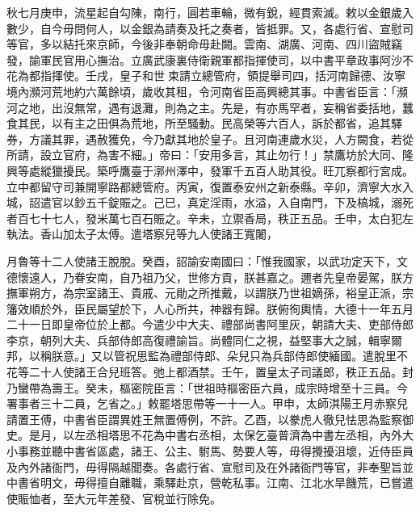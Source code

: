 \begin{pinyinscope}
 秋七月庚申，流星起自勾陳，南行，圓若車輪，微有銳，經貫索滅。敕以金銀歲入數少，自今毋問何人，以金銀為請奏及托之奏者，皆抵罪。又，各處行省、宣慰司等官，多以結托來京師，今後非奉朝命毋赴闕。雲南、湖廣、河南、四川盜賊竊發，諭軍民官用心撫治。立廣武康裏侍衛親軍都指揮使司，以中書平章政事阿沙不花為都指揮使。壬戌，皇子和世束請立總管府，領提舉司四，括河南歸德、汝寧境內瀕河荒地約六萬餘頃，歲收其租，令河南省臣高興總其事。中書省臣言：「瀕河之地，出沒無常，遇有退灘，則為之主。先是，有亦馬罕者，妄稱省委括地，蠶食其民，以有主之田俱為荒地，所至騷動。民高榮等六百人，訴於都省，追其驛券，方議其罪，遇赦獲免，今乃獻其地於皇子。且河南連歲水災，人方闕食，若從所請，設立官府，為害不細。」帝曰：「安用多言，其止勿行！」禁鷹坊於大同、隆興等處縱獵擾民。築呼鷹臺于漷州澤中，發軍千五百人助其役。旺兀察都行宮成。立中都留守司兼開寧路都總管府。丙寅，復置泰安州之新泰縣。辛卯，濟寧大水入城，詔遣官以鈔五千錠賑之。己巳，真定淫雨，水溢，入自南門，下及槁城，溺死者百七十七人，發米萬七百石賑之。辛未，立禦香局，秩正五品。壬申，太白犯左執法。香山加太子太傅。遣塔察兒等九人使諸王寬闍，



 月魯等十二人使諸王脫脫。癸酉，詔諭安南國曰：「惟我國家，以武功定天下，文德懷遠人，乃眷安南，自乃祖乃父，世修方貢，朕甚嘉之。邇者先皇帝晏駕，朕方撫軍朔方，為宗室諸王、貴戚、元勛之所推戴，以謂朕乃世祖嫡孫，裕皇正派，宗籓效順於外，臣民屬望於下，人心所共，神器有歸。朕俯徇輿情，大德十一年五月二十一日即皇帝位於上都。今遣少中大夫、禮部尚書阿里灰，朝請大夫、吏部侍郎李京，朝列大夫、兵部侍郎高復禮諭旨。尚體同仁之視，益堅事大之誠，輯寧爾邦，以稱朕意。」又以管祝思監為禮部侍郎、朵兒只為兵部侍郎使緬國。遣脫里不花等二十人使諸王合兒班答。弛上都酒禁。壬午，置皇太子司議郎，秩正五品。封乃蠻帶為壽王。癸未，樞密院臣言：「世祖時樞密臣六員，成宗時增至十三員。今署事者三十二員，乞省之。」敕罷塔思帶等一十一人。甲申，太師淇陽王月赤察兒請置王傅，中書省臣謂異姓王無置傅例，不許。乙酉，以豢虎人徹兒怯思為監察御史。是月，以左丞相塔思不花為中書右丞相，太保乞臺普濟為中書左丞相，內外大小事務並聽中書省區處，諸王、公主、駙馬、勢要人等，毋得攪擾沮壞，近侍臣員及內外諸衙門，毋得隔越聞奏。各處行省、宣慰司及在外諸衙門等官，非奉聖旨並中書省明文，毋得擅自離職，乘驛赴京，營乾私事。江南、江北水旱饑荒，已嘗遣使賑恤者，至大元年差發、官稅並行除免。




\end{pinyinscope}
